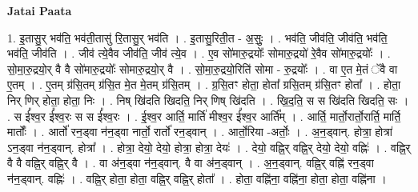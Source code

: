 \documentclass[17pt]{extarticle}
\begin{document}
\textbf{Jatai Paata} \newline

1. इ॒तासु॒र् भव॑ति॒ भव॑ती॒तासु॑ रि॒तासु॒र् भव॑ति । . इ॒तासु॒रिती॒त - अ॒सुः॒ । . भव॑ति॒ जीव॑ति॒ जीव॑ति॒ भव॑ति॒ भव॑ति॒ जीव॑ति । . जीव॑ त्ये॒वैव जीव॑ति॒ जीव॑ त्ये॒व । . ए॒व सो॑मारु॒द्रयोः᳚ सोमारु॒द्रयो॑ रे॒वैव सो॑मारु॒द्रयोः᳚ । . सो॒मा॒रु॒द्रयो॒र् वै वै सो॑मारु॒द्रयोः᳚ सोमारु॒द्रयो॒र् वै । . सो॒मा॒रु॒द्रयो॒रिति॑ सोमा - रु॒द्रयोः᳚ । . वा ए॒त मे॒तं ॅवै वा ए॒तम् । . ए॒तम् ग्र॑सि॒तम् ग्र॑सि॒त मे॒त मे॒तम् ग्र॑सि॒तम् । . ग्र॒सि॒तꣳ होता॒ होता᳚ ग्रसि॒तम् ग्र॑सि॒तꣳ होता᳚ । . होता॒ निर् णिर् होता॒ होता॒ निः । . निष् खि॑दति खिदति॒ निर् णिष् खि॑दति । . खि॒द॒ति॒ स स खि॑दति खिदति॒ सः । . स ई᳚श्व॒र ई᳚श्व॒रः स स ई᳚श्व॒रः । . ई॒श्व॒र आर्ति॒ मार्ति॑ मीश्व॒र ई᳚श्व॒र आर्ति᳚म् । . आर्ति॒ मार्तो॒रार्तो॒रार्ति॒ मार्ति॒ मार्तोः᳚ । . आर्तो॑ रन॒ड्वा न॑न॒ड्वा नार्तो॒ रार्तो॑ रन॒ड्वान् । . आर्तो॒रिया -अर्तोः॒ । . अ॒न॒ड्वान्. होत्रा॒ होत्रा॑ ऽन॒ड्वा न॑न॒ड्वान्. होत्रा᳚ । . होत्रा॒ देयो॒ देयो॒ होत्रा॒ होत्रा॒ देयः॑ । . देयो॒ वह्नि॒र् वह्नि॒र् देयो॒ देयो॒ वह्निः॑ । . वह्नि॒र् वै वै वह्नि॒र् वह्नि॒र् वै । . वा अ॑न॒ड्वा न॑न॒ड्वान्. वै वा अ॑न॒ड्वान् । . अ॒न॒ड्वान्. वह्नि॒र् वह्नि॑ रन॒ड्वा न॑न॒ड्वान्. वह्निः॑ । . वह्नि॒र् होता॒ होता॒ वह्नि॒र् वह्नि॒र् होता᳚ । . होता॒ वह्नि॑ना॒ वह्नि॑ना॒ होता॒ होता॒ वह्नि॑ना । \newline
\end{document}
